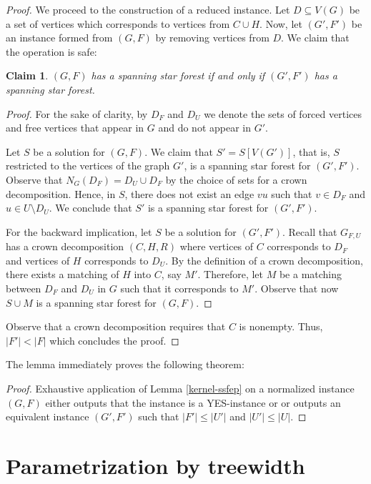 \documentclass[en]{pracamgr}
\newtheorem{claim}{Claim}
\theoremstyle{definition}
\begin{document}
\begin{proof}
	We proceed to the construction of a reduced instance. Let $D \subseteq V(G)$ be a set of vertices which corresponds to vertices from $C \cup H$. Now, let $(G',F')$ be an instance formed from $(G,F)$ by removing vertices from $D$. We claim that the operation is safe:
	
	\begin{claim}
		$(G,F)$ has a spanning star forest if and only if $(G',F')$ has a spanning star forest.
	\end{claim}
	\begin{proof}
		For the sake of clarity, by $D_F$ and $D_U$ we denote the sets of forced vertices and free vertices that appear in $G$ and do not appear in $G'$.
		
		Let $S$ be a solution for $(G,F)$. We claim that $S' = S[V(G')]$, that is, $S$ restricted to the vertices of the graph $G'$, is a spanning star forest for $(G',F')$. Observe that $N_G(D_F) = D_U \cup D_F$ by the choice of sets for a crown decomposition. Hence, in $S$, there does not exist an edge $vu$ such that $v \in D_F$ and $u \in U \setminus D_U$. We conclude that $S'$ is a spanning star forest for $(G',F')$.
		
		For the backward implication, let $S$ be a solution for $(G',F')$. Recall that $G_{F,U}$ has a crown decomposition $(C,H,R)$ where vertices of $C$ corresponds to $D_F$ and vertices of $H$ corresponds to $D_U$. By the definition of a crown decomposition, there exists a matching of $H$ into $C$, say $M'$. Therefore, let $M$ be a matching between $D_F$ and $D_U$ in $G$ such that it corresponds to $M'$. Observe that now $S \cup M$ is a spanning star forest for $(G,F)$.
	\end{proof}
	
	Observe that a crown decomposition requires that $C$ is nonempty. Thus, $|F'| < |F|$ which concludes the proof. \qedhere
	
\end{proof}

The lemma immediately proves the following theorem:

\thmssfepkernel*

\begin{proof}
	Exhaustive application of Lemma \ref{kernel-ssfep} on a normalized instance $(G,F)$ either outputs that the instance is a YES-instance or or outputs an equivalent instance $(G',F')$ such that $|F'| \leq |U'|$ and $|U'| \leq |U|$.
\end{proof}

\section{Parametrization by treewidth}
\end{document}
